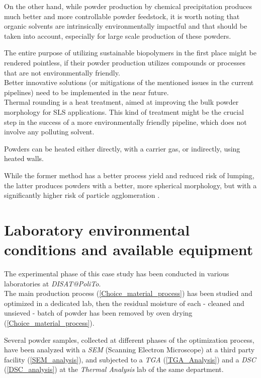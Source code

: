 \documentclass{article}
\begin{document}
    On the other hand, while powder production by 
    chemical precipitation produces much better and more 
    controllable powder feedstock, it is worth noting that organic solvents are intrinsically environmentally impactful and that should be taken 
    into account, especially for large scale production of these powders. 

    The entire purpose of utilizing sustainable biopolymers in the first place might be rendered pointless, if their powder production 
    utilizes compounds or processes that are not environmentally friendly. \\ 

    Better innovative solutions (or mitigations of the mentioned issues in the current pipelines) need to be implemented in the near future. \\ 

    Thermal rounding is a heat treatment, aimed at improving the bulk powder morphology for SLS applications. 
    This kind of treatment might be the crucial step in the success of a more environmentally friendly pipeline, which does not involve 
    any polluting solvent.

    Powders can be heated either directly, with a carrier gas, or indirectly, using heated walls. 

    While the former method has a better process yield and reduced risk of lumping, the latter produces powders with 
    a better, more spherical morphology, but with a significantly higher risk of particle agglomeration \autocite{Dechet_Schmidt_thermal_rounding}.

    \clearpage

    \section{Laboratory environmental conditions and available equipment\label{Lab_condition_equipment}}

    The experimental phase of this case study has been conducted in various laboratories at \textit{DISAT@PoliTo}. \\ 

    The main production process (\ref{Choice_material_process}) has been studied and optimized in 
    a dedicated lab, then the residual moisture of each - cleaned and 
    unsieved - batch of powder has been removed by oven drying (\ref{Choice_material_process}).

    Several powder samples, collected at different phases of the optimization process, have been analyzed 
    with a \textit{SEM} (Scanning Electron Microscope) at a third party 
    facility (\ref{SEM_analysis}), and subjected to 
    a \textit{TGA} (\ref{TGA_Analysis}) and a \textit{DSC} (\ref{DSC_analysis}) 
    at the \textit{Thermal Analysis} lab of the same department. \\ 
    
\end{document}
